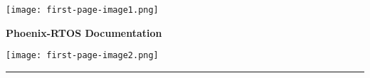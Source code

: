 %
%
%
%

\clearpage
\thispagestyle{empty}

\texttt{[image: first-page-image1.png]}

\vspace{3.5cm}

{\setmainfont{Liberation Sans}
\textcolor{ps-darkblue}{%
    {\fontsize{28}{36}\selectfont \textbf{Phoenix-RTOS Documentation}}
}}

\vspace{2.25cm}

\begin{flushright}
    \texttt{[image: first-page-image2.png]}
\end{flushright}

\vspace{\fill}

\begin{center}
    \color{ps-orange}\rule{\textwidth}{2pt}
\end{center}

\clearpage
\pagestyle{plain}
